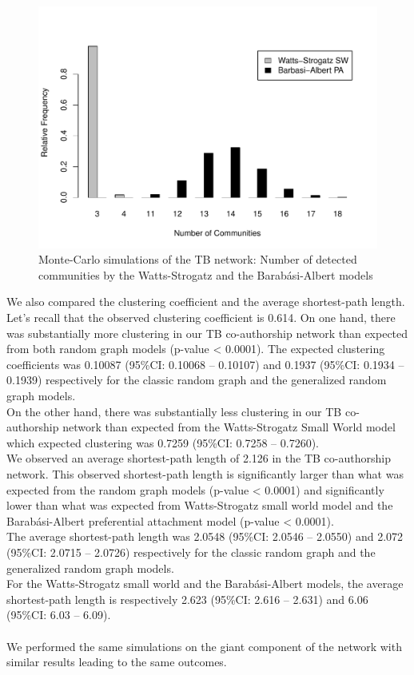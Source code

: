 \begin{figure}[h!]
\centering
\includegraphics[scale=0.65]{Chapters/tb/mechanisticComm}
\caption{Monte-Carlo simulations of the TB network: Number of detected communities by the Watts-Strogatz and the Barab\'asi-Albert models}
\label{tb_fig4}
\end{figure}

We also compared the clustering coefficient and the average shortest-path length. Let's recall that the observed clustering coefficient is 0.614. On one hand, there was substantially more clustering in our TB co-authorship network than expected from both random graph models (p-value < 0.0001). The expected clustering coefficients was 0.10087 (95\%CI: 0.10068 -- 0.10107) and 0.1937 (95\%CI: 0.1934 -- 0.1939) respectively for the classic random graph and the generalized random graph models.\\
On the other hand, there was substantially less clustering in our TB co-authorship network than expected from the Watts-Strogatz Small World model which expected clustering was 0.7259 (95\%CI: 0.7258 -- 0.7260).\\
We observed an average shortest-path length of 2.126 in the TB co-authorship network. This observed shortest-path length is significantly larger than what was expected from the random graph models (p-value < 0.0001) and significantly lower than what was expected from Watts-Strogatz small world model and the Barab\'asi-Albert preferential attachment model (p-value < 0.0001).\\
The average shortest-path length was 2.0548 (95\%CI: 2.0546 -- 2.0550) and 2.072 (95\%CI: 2.0715 -- 2.0726) respectively for the classic random graph and the generalized random graph models.\\For the Watts-Strogatz small world and the Barab\'asi-Albert models, the average shortest-path length is respectively 2.623 (95\%CI: 2.616 -- 2.631) and 6.06 (95\%CI: 6.03 -- 6.09).\\~\\
We performed the same simulations on the giant component of the network with similar results leading to the same outcomes.

